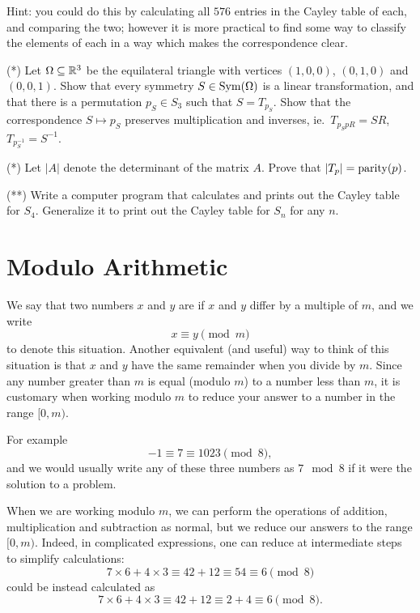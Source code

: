 \begin{exercises}
    Hint: you could do this by calculating all $576$ entries in the Cayley
    table of each, and comparing the two; however it is more practical to
    find some way to classify the elements of each in a way which makes the
    correspondence clear.
  
  \item (*) Let $\Omega \subseteq \mathbb{R}^{3}$ be the equilateral triangle
    with vertices $(1,0,0)$, $(0,1,0)$ and $(0,0,1)$.  Show that every
    symmetry $S \in \operatorname{Sym}(\Omega)$ is a linear transformation, and that there
    is a permutation $p_{S} \in S_{3}$ such that $S = T_{p_{S}}$. 
    Show that the correspondence $S \mapsto p_{S}$ preserves multiplication
    and inverses, ie.\ $T_{p_{S}p{R}} = SR$, $T_{p_{S}^{-1}} = S^{-1}$.
  
  \item (*) Let $|A|$ denote the determinant of the matrix $A$.
    Prove that $|T_{p}| = \operatorname{parity}(p)$.
  
  \item (**) Write a computer program that calculates and prints out the
    Cayley table for $S_{4}$.  Generalize it to print out the Cayley table
    for $S_{n}$ for any $n$.
\end{exercises}

\section{Modulo Arithmetic}\label{section:moduloarithmetic}

We say that two numbers $x$ and $y$ are  if $x$ and
$y$ differ by a multiple of $m$, and we write
\[
  x \equiv y \pmod m
\]
to denote this situation.  Another equivalent (and useful) way to think of
this situation is that $x$ and $y$ have the same remainder when you divide
by $m$.  Since any number greater than $m$ is equal (modulo $m$) to a number
less than $m$, it is customary when working modulo $m$ to reduce your answer
to a number in the range $[0,m)$.

For example
\[
  -1 \equiv 7 \equiv 1023 \pmod 8,
\]
and we would usually write any of these three numbers as $7 \mod 8$ if it
were the solution to a problem.

When we are working modulo $m$, we can perform the operations of addition,
multiplication and subtraction as normal, but we reduce our answers to the
range $[0,m)$.  Indeed, in complicated expressions, one can reduce at
intermediate steps to simplify calculations:
\[
  7 \times 6 + 4 \times 3 \equiv 42 + 12 \equiv 54 \equiv 6 \pmod 8
\]
could be instead calculated as
\[
  7 \times 6 + 4 \times 3 \equiv 42 + 12 \equiv 2 + 4 \equiv 6 \pmod 8.
\]

